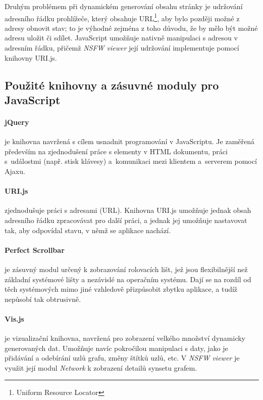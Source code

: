 \documentclass[a4paper, 11pt, oneside]{book}
\newcommand{\simplywn}{\textit{NSFW viewer} }
\begin{document}
					Druhým problémem při dynamickém generování obsahu stránky je udržování adresního řádku prohlížeče, který obsahuje URL\footnote{Uniform Resource Locator}, aby bylo později možné z adresy obnovit stav; to je výhodné zejména z toho důvodu, že by mělo být možné adresu uložit či sdílet. JavaScript umožňuje nativně manipulaci s adresou v adresním řádku, přičemž \simplywn její udržování implementuje pomocí knihovny URI.js. \parencite{urijsWeb}

				\subsection{Použité knihovny a zásuvné moduly pro JavaScript}

					\paragraph{jQuery} je knihovna navržená s cílem usnadnit programování v JavaScriptu. Je zaměřená především na zjednodušení práce s elementy v HTML dokumentu, práci s~událostmi (např. stisk klávesy) a~komunikaci mezi klientem a~serverem pomocí Ajaxu. \parencite{jqueryWeb}

					\paragraph{URI.js} zjednodušuje práci s adresami (URL). Knihovna URI.js umožňuje jednak obsah adresního řádku zpracovávat pro další práci, a jednak jej umožňuje nastavovat tak, aby odpovídal stavu, v němž se aplikace nachází. \parencite{urijsWeb}

					\paragraph{Perfect Scrollbar} je zásuvný modul určený k zobrazování rolovacích lišt, jež jsou flexibilnější než základní systémové lišty a nezávislé na operačním systému. Dají se na rozdíl od těch systémových mimo jiné vzhledově přizpůsobit zbytku aplikace, a tudíž nepůsobí tak obtrusivně. \parencite{perfectScrollbarGithub}

					\paragraph{Vis.js} je vizualizační knihovna, navržená pro zobrazení velkého množství dynamicky generovaných dat. Umožňuje navíc pokročilou manipulaci s daty, jako je přidávání a odebírání uzlů grafu, změny štítků uzlů, etc. V \simplywn je využit její modul \textit{Network} k zobrazení detailů synsetu grafem. \parencite{visjWeb}
\end{document}
